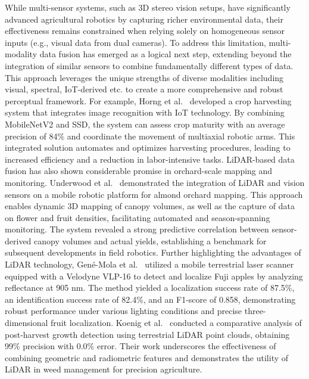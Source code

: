 \documentclass[pdflatex,sn-mathphys-num]{sn-jnl}
\begin{document}
While multi-sensor systems, such as 3D stereo vision setups, have significantly advanced agricultural robotics by capturing richer environmental data, their effectiveness remains constrained when relying solely on homogeneous sensor inputs (e.g., visual data from dual cameras). To address this limitation, multi-modality data fusion has emerged as a logical next step, extending beyond the integration of similar sensors to combine fundamentally different types of data. This approach leverages the unique strengths of diverse modalities including visual, spectral, IoT-derived etc. to create a more comprehensive and robust perceptual framework.
For example, Horng et al.~\cite{horng2019smart} developed a crop harvesting system that integrates image recognition with IoT technology. By combining MobileNetV2 and SSD, the system can assess crop maturity with an average precision of 84\% and coordinate the movement of multiaxial robotic arms. This integrated solution automates and optimizes harvesting procedures, leading to increased efficiency and a reduction in labor-intensive tasks.
LiDAR-based data fusion has also shown considerable promise in orchard-scale mapping and monitoring. Underwood et al.~\cite{underwood2016mapping} demonstrated the integration of LiDAR and vision sensors on a mobile robotic platform for almond orchard mapping. This approach enables dynamic 3D mapping of canopy volumes, as well as the capture of data on flower and fruit densities, facilitating automated and season-spanning monitoring. The system revealed a strong predictive correlation between sensor-derived canopy volumes and actual yields, establishing a benchmark for subsequent developments in field robotics.
Further highlighting the advantages of LiDAR technology, Gené-Mola et al.~\cite{gene2019fruit} utilized a mobile terrestrial laser scanner equipped with a Velodyne VLP-16 to detect and localize Fuji apples by analyzing reflectance at 905 nm. The method yielded a localization success rate of 87.5\%, an identification success rate of 82.4\%, and an F1-score of 0.858, demonstrating robust performance under various lighting conditions and precise three-dimensional fruit localization. Koenig et al.~\cite{koenig2015comparative} conducted a comparative analysis of post-harvest growth detection using terrestrial LiDAR point clouds, obtaining 99\% precision with 0.0\% error. Their work underscores the effectiveness of combining geometric and radiometric features and demonstrates the utility of LiDAR in weed management for precision agriculture.
\end{document}
